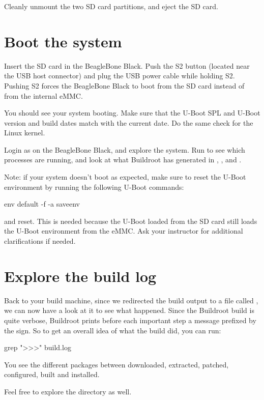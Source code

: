 Cleanly unmount the two SD card partitions, and eject the SD card.

\section{Boot the system}

Insert the SD card in the BeagleBone Black. Push the S2 button
(located near the USB host connector) and plug the USB power cable
while holding S2. Pushing S2 forces the BeagleBone Black to boot from
the SD card instead of from the internal eMMC.

You should see your system booting. Make sure that the U-Boot SPL and
U-Boot version and build dates match with the current date. Do the
same check for the Linux kernel.

Login as  on the BeagleBone Black, and explore the
system. Run  to see which processes are running, and look at
what Buildroot has generated in , , 
and .

Note: if your system doesn't boot as expected, make sure to reset the
U-Boot environment by running the following U-Boot commands:

\begin{bashinput}
env default -f -a
saveenv
\end{bashinput}

and reset. This is needed because the U-Boot loaded from the SD card
still loads the U-Boot environment from the eMMC. Ask your instructor
for additional clarifications if needed.

\section{Explore the build log}

Back to your build machine, since we redirected the build output to a
file called , we can now have a look at it to see what
happened. Since the Buildroot build is quite verbose, Buildroot prints
before each important step a message prefixed by the \code{>>>}
sign. So to get an overall idea of what the build did, you can run:

\begin{bashinput}
grep ">>>" build.log
\end{bashinput}

You see the different packages between downloaded, extracted, patched,
configured, built and installed.

Feel free to explore the  directory as well.
